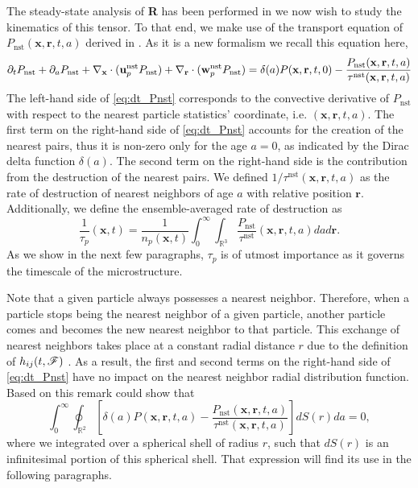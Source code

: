 The steady-state analysis of \textbf{R} has been performed in \citet{fintzi2024buoyancy} we now wish to study the kinematics   of this tensor. 
To that end, we make use of the transport equation of $P_\text{nst}(\textbf{x},\textbf{r},t,a)$ derived in \citet{zhang2023evolution}.
As it is a new formalism we recall this equation here, 
\begin{equation}
    \pddt P_\text{nst}
    + \pdda P_\text{nst}
    + \pddx \cdot  (\textbf{u}^\text{nst}_p P_\text{nst})
    + \pddr \cdot  (\textbf{w}^\text{nst}_p P_\text{nst})
    = \delta(a)P(\textbf{x},\textbf{r},t,0)
    - \frac{P_\text{nst}(\textbf{x},\textbf{r},t,a)}{\tau^\text{nst}(\textbf{x},\textbf{r},t,a)}
    \label{eq:dt_Pnst}
\end{equation}
The left-hand side of \ref{eq:dt_Pnst} corresponds to the convective derivative of $P_\text{nst}$ with respect to the nearest particle statistics' coordinate, i.e. $(\textbf{x},\textbf{r},t,a)$. 
The first term on the right-hand side of \ref{eq:dt_Pnst} accounts for the creation of the nearest pairs, thus it is non-zero only for the age $a = 0$, as indicated by the Dirac delta function $\delta(a)$. 
The second term on the right-hand side is the contribution from the destruction of the nearest pairs.
We defined $1/\tau^\text{nst}(\textbf{x},\textbf{r},t,a)$ as the rate of destruction of nearest neighbors of age $a$ with relative position $\textbf{r}$.
Additionally, we define the ensemble-averaged rate of destruction as
\begin{equation}
    \frac{1}{\tau_p}(\textbf{x},t) = 
    \frac{1}{n_p(\textbf{x},t)}
    \int_{0}^\infty
    \int_{\mathbb{R}^3}
    \frac{P_\text{nst} }{\tau^\text{nst}}(\textbf{x},\textbf{r},t,a)
    da d\textbf{r}. 
    \label{eq:tau_p}
\end{equation}
As we show in the next few paragraphs, $\tau_p$ is of utmost importance as it governs the timescale of the microstructure.

Note that a given particle always possesses a nearest neighbor.
Therefore, when a particle stops being the nearest neighbor of a given particle, another particle comes and becomes the new nearest neighbor to that particle.
This exchange of nearest neighbors takes place at a constant radial distance $r$ due to the definition of $h_{ij}(t,\mathscr{F})$ \citep{zhang2021ensemble}. 
As a result, the first and second terms on the right-hand side of \ref{eq:dt_Pnst} have no impact on the nearest neighbor radial distribution function. 
Based on this remark \citep{zhang2023evolution} could show that
\begin{equation}
    \int_{0}^{\infty}\oint_{\mathbb{R}^2}\left[
        \delta(a)P(\textbf{x},\textbf{r},t,a)
    - \frac{P_\text{nst}(\textbf{x},\textbf{r},t,a)}{\tau^\text{nst}(\textbf{x},\textbf{r},t,a)}
    \right]dS(r) da    
    =0,
    \label{eq:int_dt_h}
\end{equation}
where we integrated over a spherical shell of radius $r$, such that $dS(r)$ is an infinitesimal portion of this spherical shell. 
That expression will find its use in the following paragraphs. 


